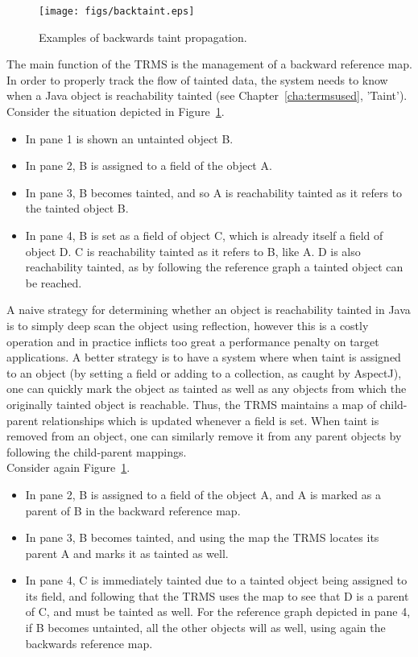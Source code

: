 \documentclass[msc,oneside]{ubcthesis}
\begin{document}
\begin{figure}[ht]
  \begin{center}
    \texttt{[image: figs/backtaint.eps]}
    \caption[Examples of backwards taint propagation.]{\label{fig:backtaint} Examples of backwards taint propagation.}
  \end{center}
\end{figure}

The main function of the TRMS is the management of a backward reference map. In order to properly track the flow of tainted data, the system needs to know when a Java object is reachability tainted (see Chapter~\ref{cha:termsused}, 'Taint').\\

Consider the situation depicted in Figure~\ref{fig:backtaint}. 
\begin{itemize}
\item In pane 1 is shown an untainted object B.
\item In pane 2, B is assigned to a field of the object A.
\item In pane 3, B becomes tainted, and so A is reachability tainted as it refers to the tainted object B.
\item In pane 4, B is set as a field of object C, which is already itself a field of object D. C is reachability tainted as it refers to B, like A. D is also reachability tainted, as by following the reference graph a tainted object can be reached. 
\end{itemize}

A naive strategy for determining whether an object is reachability tainted in Java is to simply deep scan the object using reflection, however this is a costly operation and in practice inflicts too great a performance penalty on target applications. A better strategy is to have a system where when taint is assigned to an object (by setting a field or adding to a collection, as caught by AspectJ), one can quickly mark the object as tainted as well as any objects from which the originally tainted object is reachable. Thus, the TRMS maintains a map of child-parent relationships which is updated whenever a field is set. When taint is removed from an object, one can similarly remove it from any parent objects by following the child-parent mappings.\\

Consider again Figure~\ref{fig:backtaint}. 
\begin{itemize}
\item In pane 2, B is assigned to a field of the object A, and A is marked as a parent of B in the backward reference map.
\item In pane 3, B becomes tainted, and using the map the TRMS locates its parent A and marks it as tainted as well.
\item In pane 4, C is immediately tainted due to a tainted object being assigned to its field, and following that the TRMS uses the map to see that D is a parent of C, and must be tainted as well. For the reference graph depicted in pane 4, if B becomes untainted, all the other objects will as well, using again the backwards reference map.
\end{itemize}
\end{document}
